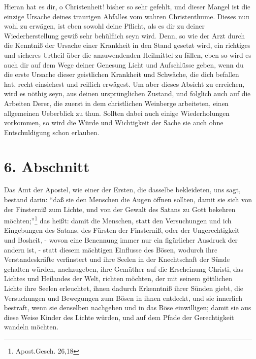 Hieran hat es dir, o Christenheit! bisher so sehr gefehlt, und dieser Mangel ist die einzige Ursache deines traurigen Abfalles vom wahren Christenthume. Dieses nun wohl zu erwägen, ist eben sowohl deine Pflicht, als es dir zu deiner Wiederherstellung gewiß sehr behülflich seyn wird. Denn, so wie der Arzt durch die Kenntniß der Ursache einer Krankheit in den Stand gesetzt wird, ein richtiges und sicheres Urtheil über die anzuwendenden Heilmittel zu fällen, eben so wird es auch dir auf dem Wege deiner Genesung Licht und Aufschlüsse geben, wenn du die erste Ursache dieser geistlichen Krankheit und Schwäche, die dich befallen hat, recht einsiehest und reiflich erwägest. Um aber dieses Absicht zu erreichen, wird es nöthig seyn, aus deinen ursprünglichen Zustand, und folglich auch auf die Arbeiten Derer, die zuerst in dem christlichen Weinberge arbeiteten, einen allgemeinen Ueberblick zu thun. Sollten dabei auch einige Wiederholungen vorkommen, so wird die Würde und Wichtigkeit der Sache sie auch ohne Entschuldigung schon erlauben.

\section{6. Abschnitt}

Das Amt der Apostel, wie einer der Ersten, die dasselbe bekleideten, uns sagt, bestand darin: "`daß sie den Menschen die Augen öffnen sollten, damit sie sich von der Finsterniß zum Lichte, und von der Gewalt des Satans zu Gott bekehren möchten;"'\footnote{Apost.Gesch. 26,18} das heißt: damit die Menschen, statt den Versuchungen und ich Eingebungen des Satans, des Fürsten der Finsterniß, oder der Ungerechtigkeit und Bosheit, - wovon eine Benennung immer nur ein figürlicher Ausdruck der andern ist, - statt diesem mächtigen Einflusse des Bösen, wodurch ihre Verstandeskräfte verfinstert und ihre Seelen in der Knechtschaft der Sünde gehalten würden, nachzugeben, ihre Gemüther auf die Erscheinung Christi, das Lichtes und Heilandes der Welt, richten möchten, der mit seinem göttlichen Lichte ihre Seelen erleuchtet, ihnen dadurch Erkenntniß ihrer Sünden giebt, die Versuchungen und Bewegungen zum Bösen in ihnen entdeckt, und sie innerlich bestraft, wenn sie denselben nachgeben und in das Böse einwilligen; damit sie aus diese Weise Kinder des Lichte würden, und auf dem Pfade der Gerechtigkeit wandeln möchten.


